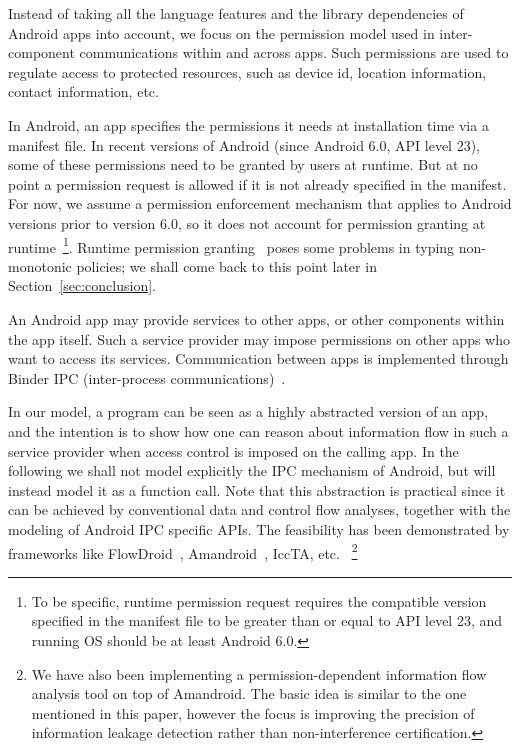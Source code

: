 Instead of taking all the language features and the library dependencies of Android apps into account, we focus on the permission model used in inter-component communications within and across apps. Such permissions are used to regulate access to protected resources, such as device id, location information, contact information, etc.

In Android, an app specifies the permissions it needs at installation time via a manifest file. In recent versions of Android (since Android 6.0, API level 23), some of these permissions need to be granted by users at runtime. But
at no point a permission request is allowed if it is not already specified in the manifest.
For now, we assume a permission enforcement mechanism that applies to Android versions prior to version 6.0, so it does not
account for permission granting at runtime~\footnote{To be specific, runtime permission request requires the compatible version specified in the manifest file to be greater than or equal to API level 23, and running OS should be at least Android 6.0.}. Runtime permission granting~\cite{url:android-perm} poses some problems in typing non-monotonic
policies; we shall come back to this point later in Section~\ref{sec:conclusion}.

An Android app may provide services to other apps,
or other components within the app itself. Such a service provider
may impose permissions on other apps who want to
access its services. Communication between apps is implemented
through Binder IPC (inter-process communications)~\cite{Android-Binder-IPC}.

In our model, a program can be seen as a highly abstracted version of an app, and the intention is to show how one can reason about information flow in such a service provider when access control is imposed on the calling app. In the following we shall not model explicitly the IPC mechanism of Android, but will instead model it as a function call. Note that this abstraction is practical since it can be achieved by conventional data and control flow analyses, together with the modeling of Android IPC specific APIs. The feasibility has been demonstrated by frameworks like FlowDroid~\cite{Arzt:2014:FPC:2666356.2594299}, Amandroid~\cite{Wei:2014:APG:2660267.2660357}, IccTA\cite{Li:2015:IDI:2818754.2818791}, etc. ~\footnote{We have also been implementing a permission-dependent information flow analysis tool on top of Amandroid. The basic idea is similar to the one mentioned in this paper, however the focus is improving the precision of information leakage detection rather than non-interference certification.}

